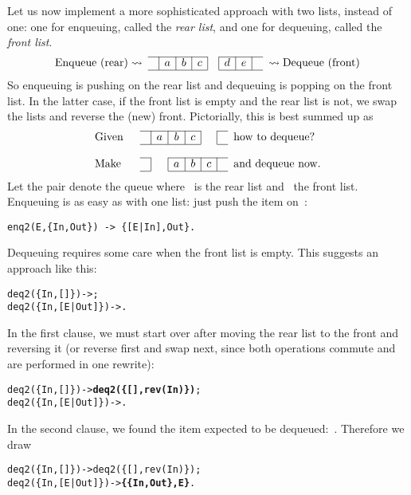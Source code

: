 Let us now implement a more sophisticated approach with two lists,
instead of one: one for enqueuing, called the \emph{rear list}, and
one for dequeuing, called the \emph{front list}.
\[
\begin{array}{r@{\;}cc|c|c|c|c|c|c|cc@{\;}l}
  \cline{3-6}\cline{8-10}
  \text{Enqueue (rear)} & \rightsquigarrow & & a & b & c & & d & e & &
  \rightsquigarrow & \text{Dequeue (front)}\\
  \cline{3-6}\cline{8-10}
\end{array}
\]
\noindent So enqueuing is pushing on the rear list and dequeuing is
popping on the front list. In the latter case, if the front list is
empty and the rear list is not, we swap the lists and reverse the
(new) front. Pictorially, this is best summed up as
\[
\begin{array}{lcc|c|c|c|c|cl}
  \cline{3-6}\cline{8-8}
  \text{Given} & & & a & b & c & & &
  \text{how to dequeue?}\\
  \cline{3-6}\cline{8-8}\\
  \cline{3-3}\cline{5-8}
  \text{Make} & & & & a & b & c & &
   \text{and dequeue now.}\\
  \cline{3-3}\cline{5-8}
\end{array}
\]
\noindent Let the pair  denote the queue where
~is the rear list and~ the front
list. Enqueuing is as easy as with one list: just push the item
on~:
\begin{verbatim}
enq2(E,{In,Out}) -> {[E|In],Out}.
\end{verbatim}
Dequeuing requires some care when the front list is empty. This
suggests an approach like this:
\begin{alltt}
deq2(\{In,     []\}) -> ;
deq2(\{In,[E|Out]\}) -> .
\end{alltt}
In the first clause, we must start over after moving the rear list to
the front and reversing it (or reverse first and swap next, since both
operations commute and are performed in one rewrite):
\begin{alltt}
deq2(\{In,     []\}) -> \textbf{deq2(\{[],rev(In)\})};
deq2(\{In,[E|Out]\}) -> .
\end{alltt}

In the second clause, we found the item expected to be
dequeued:~. Therefore we draw
\begin{alltt}
deq2(\{In,     []\}) -> deq2(\{[],rev(In)\});
deq2(\{In,[E|Out]\}) -> \textbf{\{\{In,Out\},E\}}.
\end{alltt}
